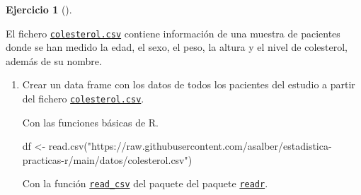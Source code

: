 \documentclass[
  a4paper,
]{scrreport}
\newenvironment{Shaded}{\begin{snugshade}}{\end{snugshade}}
\newcommand{\FunctionTok}[1]{\textcolor[rgb]{0.28,0.35,0.67}{#1}}
\newcommand{\NormalTok}[1]{\textcolor[rgb]{0.00,0.23,0.31}{#1}}
\newcommand{\OtherTok}[1]{\textcolor[rgb]{0.00,0.23,0.31}{#1}}
\newcommand{\StringTok}[1]{\textcolor[rgb]{0.13,0.47,0.30}{#1}}
\theoremstyle{definition}
\newtheorem{exercise}{Ejercicio}[chapter]
\theoremstyle{remark}
\begin{document}
\begin{exercise}[]\protect\hypertarget{exr-preprocesamiento-2}{}\label{exr-preprocesamiento-2}

El fichero \href{datos/colesterol.csv}{\texttt{colesterol.csv}} contiene
información de una muestra de pacientes donde se han medido la edad, el
sexo, el peso, la altura y el nivel de colesterol, además de su nombre.

\begin{enumerate}
\def\labelenumi{\alph{enumi}.}
\item
  Crear un data frame con los datos de todos los pacientes del estudio a
  partir del fichero
  \href{datos/colesterol.csv}{\texttt{colesterol.csv}}.

  \begin{tcolorbox}[enhanced jigsaw, coltitle=black, left=2mm, colback=white, leftrule=.75mm, toptitle=1mm, breakable, bottomrule=.15mm, titlerule=0mm, bottomtitle=1mm, title=\textcolor{quarto-callout-tip-color}{\faLightbulb}\hspace{0.5em}{Solución 1}, arc=.35mm, toprule=.15mm, rightrule=.15mm, colframe=quarto-callout-tip-color-frame, opacityback=0, colbacktitle=quarto-callout-tip-color!10!white, opacitybacktitle=0.6]

  Con las funciones básicas de R.

\begin{Shaded}
\begin{Highlighting}[]
\NormalTok{df }\OtherTok{\textless{}{-}} \FunctionTok{read.csv}\NormalTok{(}\StringTok{"https://raw.githubusercontent.com/asalber/estadistica{-}practicas{-}r/main/datos/colesterol.csv"}\NormalTok{)}
\end{Highlighting}
\end{Shaded}

  \end{tcolorbox}

  \begin{tcolorbox}[enhanced jigsaw, coltitle=black, left=2mm, colback=white, leftrule=.75mm, toptitle=1mm, breakable, bottomrule=.15mm, titlerule=0mm, bottomtitle=1mm, title=\textcolor{quarto-callout-tip-color}{\faLightbulb}\hspace{0.5em}{Solución 2}, arc=.35mm, toprule=.15mm, rightrule=.15mm, colframe=quarto-callout-tip-color-frame, opacityback=0, colbacktitle=quarto-callout-tip-color!10!white, opacitybacktitle=0.6]

  Con la función
  \href{https://readr.tidyverse.org/reference/read_delim.html}{\texttt{read\_csv}}
  del paquete del paquete
  \href{https://readr.tidyverse.org/index.html}{\texttt{readr}}.


\end{tcolorbox}
\end{enumerate}
\end{exercise}
\end{document}
